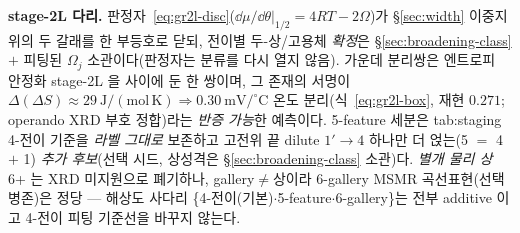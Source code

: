 \begin{keybox}
\textbf{stage-2L 다리.} 판정자~\eqref{eq:gr2l-disc}($\dd\mu/\dd\theta|_{1/2}=4RT-2\Omega$)가 \S\ref{sec:width}
이중지위의 두 갈래를 한 부등호로 닫되, 전이별 두-상/고용체 \emph{확정}은 \S\ref{sec:broadening-class} $+$ 피팅된
$\Omega_j$ 소관이다(판정자는 분류를 다시 열지 않음). 가운데 분리쌍은 엔트로피 안정화 stage-2L 을 사이에 둔 한
쌍이며, 그 존재의 서명이 $\Delta(\Delta S)\approx29\ \mathrm{J/(mol\,K)}\Rightarrow0.30\ \mathrm{mV/^\circ C}$
온도 분리(식~\eqref{eq:gr2l-box}, 재현 $0.271$; operando XRD 부호 정합\cite{schmitt2022})라는 \emph{반증 가능}한
예측이다. 5-feature 세분은 tab:staging 4-전이 기준을 \emph{라벨 그대로} 보존하고 고전위 끝 dilute $1'\!\to\!4$
하나만 더 얹는(5 $=$ 4 $+$ 1) \emph{추가 후보}(선택 시드, 상성격은 \S\ref{sec:broadening-class} 소관)다. \emph{별개 물리 상}
6+ 는 XRD 미지원으로 폐기하나, gallery$\ne$상이라 6-gallery MSMR 곡선표현(선택 병존)은
정당 --- 해상도 사다리 \{4-전이(기본)$\cdot$5-feature$\cdot$6-gallery\}는 전부 additive 이고 4-전이 피팅 기준선을 바꾸지 않는다.
\end{keybox}

